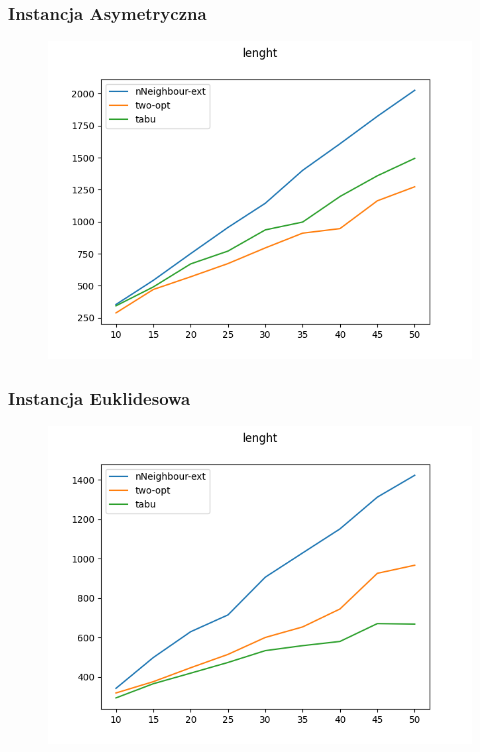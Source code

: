 \documentclass[11pt]{article}
\begin{document}
        \subsubsection{Instancja Asymetryczna }
                \begin{center}
                \begin{figure}[H]

                    \includegraphics[scale=0.6]{timedAsymetricLenght.png}

                \end{figure}
                \end{center}
        \subsubsection{Instancja Euklidesowa }
                \begin{center}
                \begin{figure}[H]

                    \includegraphics[scale=0.6]{timedEuc2dLenght.png}

                \end{figure}
                \end{center}
\end{document}
